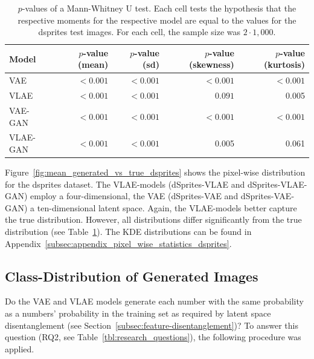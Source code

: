 \begin{table}
    \begin{tabular}{lrrrr}
        \toprule
        Model              & $p$-value (mean) & $p$-value (sd) & $p$-value (skewness) & $p$-value (kurtosis) \\
        \midrule
        \ac{VAE}           & $< 0.001$        & $< 0.001$      & $< 0.001$            & $< 0.001$            \\
        \ac{VLAE}          & $< 0.001$        & $< 0.001$      & $0.091$              & 0.005                \\
        \ac{VAE}-\ac{GAN}  & $< 0.001$        & $< 0.001$      & $< 0.001$            & $< 0.001$            \\
        \ac{VLAE}-\ac{GAN} & $< 0.001$        & $< 0.001$      & 0.005                & 0.061                \\
        \bottomrule
    \end{tabular}
    \caption[Models on dSprites - $p$-values for Distributions]{$p$-values of a Mann-Whitney U test. Each cell tests the hypothesis that the respective moments for the respective model are equal to the values for the dsprites test images. For each cell, the sample size was $2\cdot 1,000$.}
    \label{tab:vae-vlae-dsprites}
\end{table}

Figure~\ref{fig:mean_generated_vs_true_dsprites} shows the pixel-wise distribution for the dsprites dataset.
The \ac{VLAE}-models (dSprites-\ac{VLAE} and dSprites-\ac{VLAE}-\ac{GAN}) employ a four-dimensional, the \ac{VAE} (dSprites-\ac{VAE} and dSprites-\ac{VAE}-\ac{GAN}) a ten-dimensional latent space.
Again, the \ac{VLAE}-models better capture the true distribution.
However, all distributions differ significantly from the true distribution (see Table~\ref{tab:vae-vlae-dsprites}).
The \ac{KDE} distributions can be found in Appendix~\ref{subsec:appendix_pixel_wise_statistics_dsprites}.

\subsection{Class-Distribution of Generated Images}\label{subsec:class-distribution-of-generated-images}

Do the \ac{VAE} and \ac{VLAE} models generate each number with the same probability as a numbers' probability in the training set as required by latent space disentanglement (see Section~\ref{subsec:feature-disentanglement})?
To answer this question (RQ2, see Table~\ref{tbl:research_questions}), the following procedure was applied.

